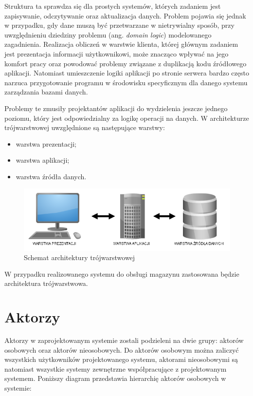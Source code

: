 Struktura ta sprawdza się dla prostych systemów, których zadaniem jest
zapisywanie, odczytywanie oraz aktualizacja danych. Problem
pojawia się jednak w przypadku, gdy dane muszą być przetwarzane w
nietrywialny sposób, przy uwzględnieniu dziedziny problemu (ang. \emph{domain
logic}) modelowanego zagadnienia. Realizacja obliczeń w warstwie klienta,
której głównym zadaniem jest prezentacja informacji użytkownikowi, może
znacząco wpływać na jego komfort pracy oraz powodować problemy związane z
duplikacją kodu źródłowego aplikacji.
Natomiast umieszczenie logiki aplikacji po stronie serwera bardzo często narzuca
przygotowanie programu w środowisku specyficznym dla danego systemu zarządzania
bazami danych. 

Problemy te zmusiły projektantów aplikacji do wydzielenia jeszcze jednego
poziomu, który jest odpowiedzialny za logikę operacji na danych. W
architekturze trójwarstwowej uwzględnione są następujące warstwy:
\begin{itemize}
 \item warstwa prezentacji;
 \item warstwa aplikacji;
 \item warstwa źródła danych.
\end{itemize}

\begin{figure}[h]
    \begin{center}
    \includegraphics[scale=0.5]{../img/arch-3warstw.png}
    \end{center}
    \label{fig:arch3warstw}
    \caption{Schemat architektury trójwarstwowej}
\end{figure}
\FloatBarrier
W przypadku realizowanego systemu do obsługi magazynu zastosowana będzie
architektura trójwarstwowa.

\section{Aktorzy}

Aktorzy w zaprojektowanym systemie zostali podzieleni na dwie grupy: aktorów
osobowych oraz aktorów nieosobowych. Do aktorów osobowym można zaliczyć
wszystkich użytkowników projektowanego systemu, aktorami nieosobowymi są
natomiast wszystkie systemy zewnętrzne współpracujące z projektowanym systemem.
Poniższy diagram przedstawia hierarchię aktorów osobowych w systemie:

